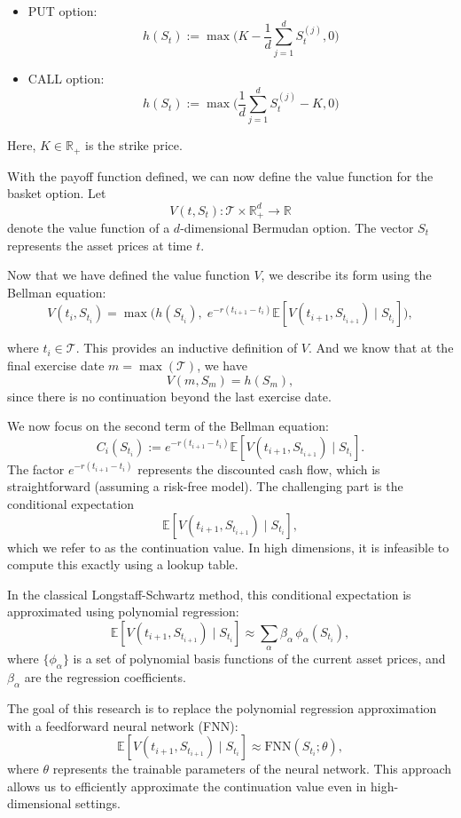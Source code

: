 \documentclass[11pt]{article}
\theoremstyle{definition}
\theoremstyle{plain}
\theoremstyle{remark}
\begin{document}
\begin{itemize}
    \item PUT option:
    \[
    h(S_t) := \max\Big(K - \frac{1}{d} \sum_{j=1}^d S_t^{(j)}, 0\Big)
    \]
    \item CALL option:
    \[
    h(S_t) := \max\Big(\frac{1}{d} \sum_{j=1}^d S_t^{(j)} - K, 0\Big)
    \]
\end{itemize}

Here, \(K \in \mathbb{R}_+\) is the strike price.

With the payoff function defined, we can now define the value function for the basket option. Let
\[
V(t, S_t) : \mathcal{T} \times \mathbb{R}_+^d \to \mathbb{R}
\]  
denote the value function of a \(d\)-dimensional Bermudan option. 
The vector \(S_t\) represents the asset prices at time \(t\).

Now that we have defined the value function \(V\), we describe its form using the Bellman equation:
\[
V(t_i, S_{t_i}) = \max \Big( h(S_{t_i}),\; e^{-r (t_{i+1} - t_i)} \mathbb{E}[ V(t_{i+1}, S_{t_{i+1}}) \mid S_{t_i} ] \Big),
\]

where \(t_i \in \mathcal{T}\). This provides an inductive definition of \(V\). And we know that at the final 
exercise date \(m = \max(\mathcal{T})\), we have
\[
V(m, S_m) = h(S_m),
\]
since there is no continuation beyond the last exercise date.

We now focus on the second term of the Bellman equation:
\[
C_i(S_{t_i}) := e^{-r (t_{i+1} - t_i)} \mathbb{E}[ V(t_{i+1}, S_{t_{i+1}}) \mid S_{t_i} ].
\]
The factor \(e^{-r (t_{i+1}-t_i)}\) represents the discounted cash flow, which is straightforward
(assuming a risk-free model). The challenging part is the conditional expectation
\[
\mathbb{E}[ V(t_{i+1}, S_{t_{i+1}}) \mid S_{t_i} ],
\]
which we refer to as the continuation value. In high dimensions, it is infeasible to compute this exactly using a lookup table.


In the classical Longstaff-Schwartz method, this conditional expectation is approximated using polynomial regression:
\[
\mathbb{E}[ V(t_{i+1}, S_{t_{i+1}}) \mid S_{t_i} ] \approx \sum_{\alpha} \beta_\alpha \, \phi_\alpha(S_{t_i}),
\]
where \(\{\phi_\alpha\}\) is a set of polynomial basis functions of the 
current asset prices, and \(\beta_\alpha\) are the regression coefficients.


The goal of this research is to replace the polynomial regression approximation with a feedforward neural network (FNN):
\[
\mathbb{E}[ V(t_{i+1}, S_{t_{i+1}}) \mid S_{t_i} ] \approx \text{FNN}(S_{t_i}; \theta),
\]
where \(\theta\) represents the trainable parameters of the neural network. 
This approach allows us to efficiently approximate the continuation value even in high-dimensional settings.
\end{document}

